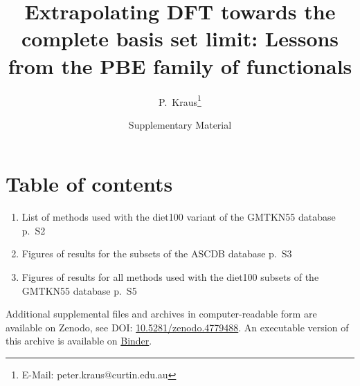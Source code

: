 \documentclass[12pt]{article}
\newcommand{\beginsupplement}{%
        \setcounter{table}{0}
        \renewcommand{\thetable}{S\arabic{table}}%
        \setcounter{figure}{0}
        \renewcommand{\thefigure}{S\arabic{figure}}%
        \renewcommand{\thepage}{S\arabic{page}}%
     }
\begin{document}
\title{Extrapolating DFT towards the complete basis set limit: Lessons from the PBE family of functionals}

\date{Supplementary Material}

\author{P.~Kraus\thanks{E-Mail: peter.kraus@curtin.edu.au}}

\maketitle




\beginsupplement

\section*{Table of contents}
\begin{enumerate}
	\item List of methods used with the diet100 variant of the GMTKN55 database \hfill p.~S2
	\item Figures of results for the subsets of the ASCDB database \hfill p.~S3
    \item Figures of results for all methods used with the diet100 subsets of the GMTKN55 database \hfill p.~S5
\end{enumerate}

Additional supplemental files and archives in computer-readable form are available on Zenodo, see DOI: \href{http://dx.doi.org/10.5281/zenodo.4779488}{10.5281/zenodo.4779488}. An executable version of this archive is available on \href{https://mybinder.org/v2/zenodo/10.5281/zenodo.4779488/?filepath=index.ipynb}{Binder}.
\end{document}
